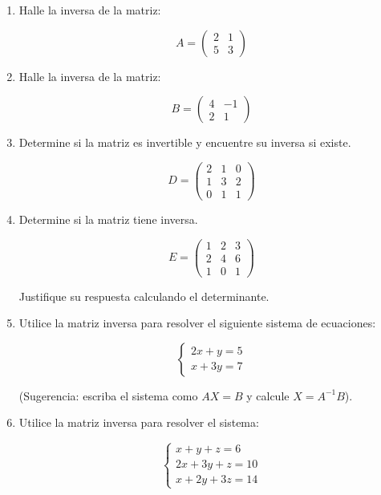 \documentclass[12pt,letterpaper]{article}
\begin{document}
\begin{enumerate}

\item Halle la inversa de la matriz:

\[
A=
\begin{pmatrix}
2 & 1 \\
5 & 3
\end{pmatrix}
\]

\item Halle la inversa de la matriz:

\[
B=
\begin{pmatrix}
4 & -1 \\
2 & 1
\end{pmatrix}
\]

\item Determine si la matriz es invertible y encuentre su inversa si existe.

\[
D=
\begin{pmatrix}
2 & 1 & 0\\
1 & 3 & 2\\
0 & 1 & 1
\end{pmatrix}
\]

\item Determine si la matriz tiene inversa.

\[
E=
\begin{pmatrix}
1 & 2 & 3\\
2 & 4 & 6\\
1 & 0 & 1
\end{pmatrix}
\]

Justifique su respuesta calculando el determinante.

\item Utilice la matriz inversa para resolver el siguiente sistema de ecuaciones:

\[
\begin{cases}
2x + y = 5 \\
x + 3y = 7
\end{cases}
\]

(Sugerencia: escriba el sistema como $AX=B$ y calcule $X=A^{-1}B$).

\item Utilice la matriz inversa para resolver el sistema:

\[
\begin{cases}
x + y + z = 6 \\
2x + 3y + z = 10 \\
x + 2y + 3z = 14
\end{cases}
\]

\end{enumerate}
\end{document}
